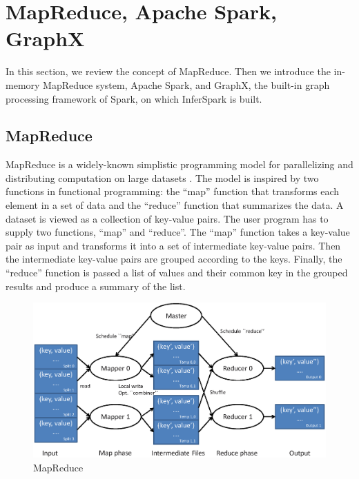 \section{MapReduce, Apache Spark, GraphX}

In this section, we review the concept of MapReduce. Then we introduce the
in-memory MapReduce system, Apache Spark, and GraphX, the built-in graph
processing framework of Spark, on which InferSpark is built.

\subsection{MapReduce}

MapReduce is a widely-known simplistic programming model for parallelizing and
distributing computation on large datasets . The model is
inspired by two functions in functional programming: the ``map'' function that
transforms each element in a set of data and the ``reduce'' function that
summarizes the data. A dataset is viewed as a collection of key-value pairs.
The user program has to supply two functions, ``map'' and ``reduce''. The
``map'' function takes a key-value pair as input and transforms it into a set
of intermediate key-value pairs. Then the intermediate key-value pairs are
grouped according to the keys. Finally, the ``reduce'' function is passed a
list of values and their common key in the grouped results and produce a
summary of the list.

\begin{figure}[t]
\centering
\includegraphics[width=0.9\linewidth,clip]{figs/mapreduce.eps}
\caption{MapReduce}
\label{fig:mapreduce}
\end{figure}

